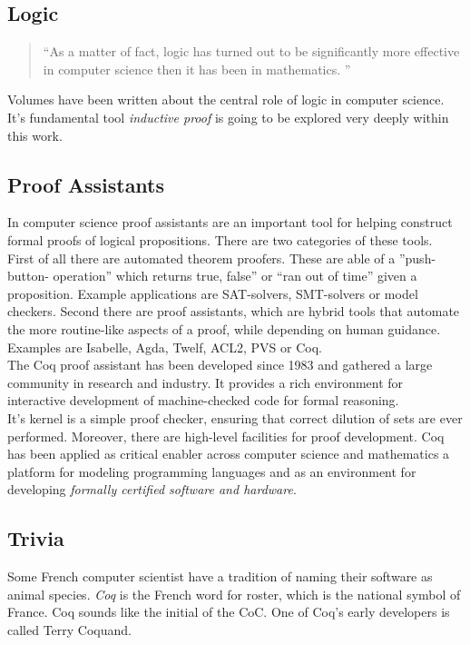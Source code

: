 \subsection{Logic}

\begin{quote}
``As a matter of fact, logic has turned out to be significantly more effective in computer science then it has been in mathematics. '' \cite{PACGGHSY} 
\end{quote}
Volumes have been written about the central role of logic in computer science. 
It's fundamental tool {\itshape inductive proof} is going to be explored very deeply within this work.


\subsection{Proof Assistants}

In computer science proof assistants are an important tool for helping construct formal proofs of logical propositions.
There are two categories of these tools.\\
First of all there are automated theorem proofers. 
These are able of a ''push-button- operation'' which returns true, false'' or ``ran out of time'' given a proposition.
Example applications are \glspl{SAT-solver}, \glspl{SMT-solver} or \glspl{model checker}. 
Second there are proof assistants, which are hybrid tools that automate the more routine-like aspects of a proof, while depending on human guidance. 
Examples are \gls{Isabelle}, Agda, Twelf, ACL2, PVS or Coq.\\
The Coq proof assistant has been developed since 1983 and gathered a large community in research and industry.
It provides a rich environment for interactive development of machine-checked code for formal reasoning.\\
It's kernel is a simple proof checker, ensuring that correct dilution of sets are ever performed. 
Moreover, there are high-level facilities for proof development.
Coq has been applied as critical enabler across computer science and mathematics a platform for modeling programming languages and as an environment for developing {\itshape formally certified software and hardware}.
 

\subsection{Trivia}

Some French computer scientist have a tradition of naming their software as animal species.
{\itshape Coq} is the French word for roster, which is the national symbol of France.
Coq sounds like the initial of the \gls{CoC}.
One of Coq's early developers is called Terry Coquand.


